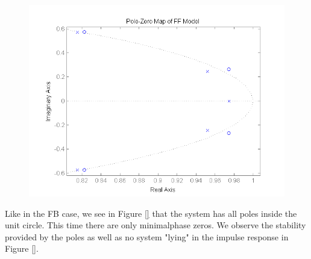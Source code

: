 \begin{figure}[h]
\centering
\includegraphics[width=1.0\textwidth]{pics/pole_FF}
\caption{}
\label{pic:}
\end{figure}

Like in the FB case, we see in Figure \ref{} that the system has all poles inside the unit circle. This time there are only minimalphase zeros. We observe the stability provided by the poles as well as no system "lying" in the impulse response in Figure \ref{}. 

